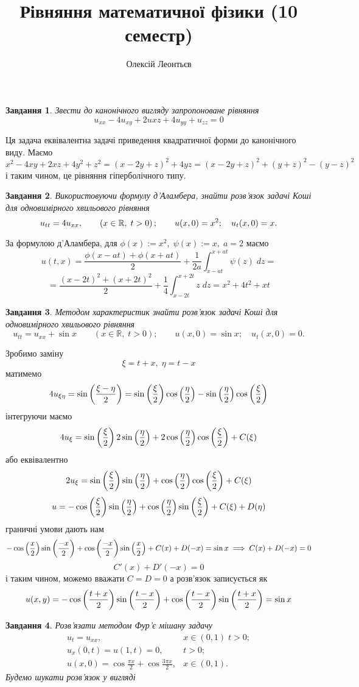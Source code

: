 \documentclass[12pt]{article} %
\title{Рівняння математичної фізики (10 семестр)}
\author{Олексій Леонтьєв}
\newtheorem{prob}{Завдання}
\newcommand{\dt}{\;dt}
\newcommand{\dx}{\;dx}
\begin{document}
\def\dx{\Delta x}
\def\dt{\Delta t}
\def\dX{\frac{\partial}{\partial x}}
\maketitle
\begin{prob}Звести до канонічного вигляду запропоноване рівняння
	\[u_{xx}-4u_{xy}+2u{xz}+4u_{yy}+u_{zz}=0\]
\end{prob}
Ця задача еквівалентна задачі приведення квадратичної форми до канонічного виду. Маємо
\[x^2-4xy+2xz+4y^2+z^2=(x-2y+z)^2+4yz=(x-2y+z)^2+(y+z)^2-(y-z)^2\]
і таким чином, це рівняння гіперболічного типу.
\setcounter{prob}{6}
\begin{prob}Використовуючи формулу д’Аламбера, знайти розв’язок задачі Коші для одновимірного хвильового рівняння
	\[u_{tt}=4u_{xx},\qquad\left(x\in\mathbb{R},\;t>0\right);\qquad u(x,0)=x^2;\quad u_t(x,0)=x.\]
\end{prob}
За формулою д’Аламбера, для $\phi(x):=x^2,\;\psi(x):=x,\;a=2$ маємо
\[u(t,x)=\frac{\phi(x-at)+\phi(x+at)}{2}+\frac{1}{2a}\int_{x-at}^{x+at}\psi(z)\;dz=\]
\[=\frac{(x-2t)^2+(x+2t)^2}{2}+\frac{1}{4}\int_{x-2t}^{x+2t}z\;dz=x^2+4t^2+{xt}\]
\setcounter{prob}{8}
\begin{prob}Методом характеристик знайти розв’язок задачі Коші для одновимірного хвильового рівняння
	\[u_{tt}=u_{xx}+\sin x\qquad(x\in\mathbb{R},\;t>0);\qquad u(x,0)=\sin x;\quad u_t(x,0)=0.\]
\end{prob}
Зробимо заміну
\[\xi=t+x,\;\eta=t-x\]
матимемо
\[4u_{\xi\eta}=\sin\left(\frac{\xi-\eta}{2}\right)=\sin\left(\frac{\xi}{2}\right)\cos\left(\frac{\eta}{2}\right)-\sin\left(\frac{\eta}{2}\right)\cos\left(
\frac{\xi}{2}\right)\]
інтегруючи маємо
\[4u_\xi=\sin\left(\frac{\xi}{2}\right)2\sin\left(\frac{\eta}{2}\right)+2\cos\left(\frac{\eta}{2}\right)\cos\left(\frac{\xi}{2}\right)+C(\xi)\]
або еквівалентно
\[2u_\xi=\sin\left(\frac{\xi}{2}\right)\sin\left(\frac{\eta}{2}\right)+\cos\left(\frac{\eta}{2}\right)\cos\left(\frac{\xi}{2}\right)+C(\xi)\]
\[u=-\cos\left(\frac{\xi}{2}\right)\sin\left(\frac{\eta}{2}\right)+\cos\left(\frac{\eta}{2}\right)\sin\left(\frac{\xi}{2}\right)+C(\xi)+D(\eta)\]
граничні умови дають нам
\[-\cos\left(\frac{x}{2}\right)\sin\left(\frac{-x}{2}\right)+\cos\left(\frac{-x}{2}\right)\sin\left(\frac{x}{2}\right)+C(x)+D(-x)=\sin x\implies
C(x)+D(-x)=0\]
\[C'(x)+D'(-x)=0\]
і таким чином, можемо вважати $C=D=0$ а розв’язок записується як
\[u(x,y)=-\cos\left(\frac{t+x}{2}\right)\sin\left(\frac{t-x}{2}\right)+\cos\left(\frac{t-x}{2}\right)\sin\left(\frac{t+x}{2}\right)=\sin x\]
\setcounter{prob}{11}
\begin{prob}Розв’язати методом Фур’є мішану задачу
	\[
	\begin{array}{cl}
		u_t=u_{xx}, &x\in(0,1)\;t>0;\\
		u_x(0,t)=u(1,t)=0,&t>0;\\
		u(x,0)=\cos\frac{\pi x}{2}+\cos\frac{3\pi x}{2},&x\in(0,1).
	\end{array}
	\]
	Будемо шукати розв’язок у вигляді
\end{prob}
\end{document}
